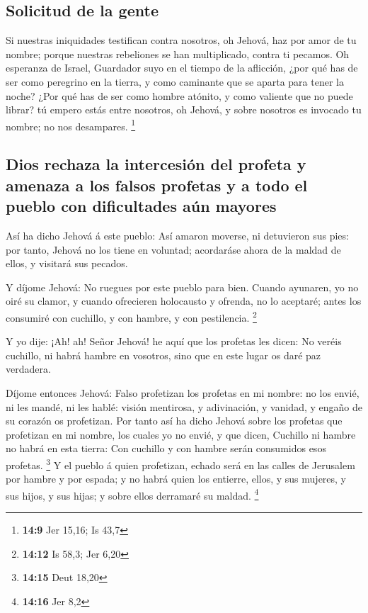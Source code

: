 \hypertarget{solicitud-de-la-gente}{%
\subsection{Solicitud de la gente}\label{solicitud-de-la-gente}}

 Si nuestras iniquidades testifican contra nosotros, oh
Jehová, haz por amor de tu nombre; porque nuestras rebeliones se han
multiplicado, contra ti pecamos.  Oh esperanza de Israel,
Guardador suyo en el tiempo de la aflicción, ¿por qué has de ser como
peregrino en la tierra, y como caminante que se aparta para tener la
noche?  ¿Por qué has de ser como hombre atónito, y como
valiente que no puede librar? tú empero estás entre nosotros, oh Jehová,
y sobre nosotros es invocado tu nombre; no nos desampares. \footnote{\textbf{14:9}
  Jer 15,16; Is 43,7}

\hypertarget{dios-rechaza-la-intercesiuxf3n-del-profeta-y-amenaza-a-los-falsos-profetas-y-a-todo-el-pueblo-con-dificultades-auxfan-mayores}{%
\subsection{Dios rechaza la intercesión del profeta y amenaza a los
falsos profetas y a todo el pueblo con dificultades aún
mayores}\label{dios-rechaza-la-intercesiuxf3n-del-profeta-y-amenaza-a-los-falsos-profetas-y-a-todo-el-pueblo-con-dificultades-auxfan-mayores}}

 Así ha dicho Jehová á este pueblo: Así amaron moverse,
ni detuvieron sus pies: por tanto, Jehová no los tiene en voluntad;
acordaráse ahora de la maldad de ellos, y visitará sus pecados.

 Y díjome Jehová: No ruegues por este pueblo para bien.
 Cuando ayunaren, yo no oiré su clamor, y cuando
ofrecieren holocausto y ofrenda, no lo aceptaré; antes los consumiré con
cuchillo, y con hambre, y con pestilencia. \footnote{\textbf{14:12} Is
  58,3; Jer 6,20}

 Y yo dije: ¡Ah! ah! Señor Jehová! he aquí que los
profetas les dicen: No veréis cuchillo, ni habrá hambre en vosotros,
sino que en este lugar os daré paz verdadera.

 Díjome entonces Jehová: Falso profetizan los profetas en
mi nombre: no los envié, ni les mandé, ni les hablé: visión mentirosa, y
adivinación, y vanidad, y engaño de su corazón os profetizan.
 Por tanto así ha dicho Jehová sobre los profetas que
profetizan en mi nombre, los cuales yo no envié, y que dicen, Cuchillo
ni hambre no habrá en esta tierra: Con cuchillo y con hambre serán
consumidos esos profetas. \footnote{\textbf{14:15} Deut 18,20}
 Y el pueblo á quien profetizan, echado será en las
calles de Jerusalem por hambre y por espada; y no habrá quien los
entierre, ellos, y sus mujeres, y sus hijos, y sus hijas; y sobre ellos
derramaré su maldad. \footnote{\textbf{14:16} Jer 8,2}

